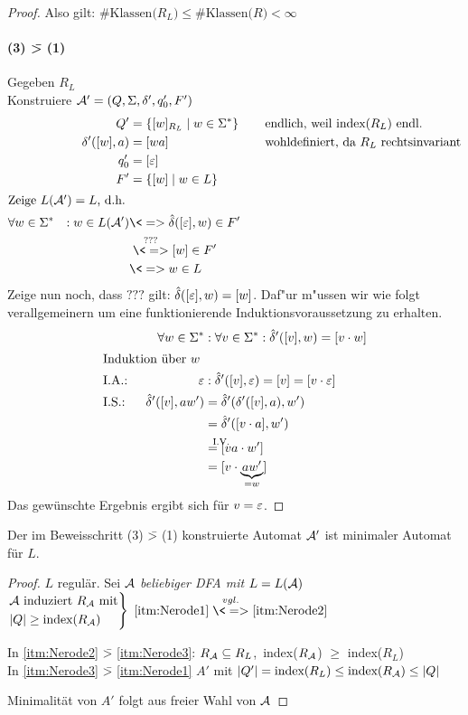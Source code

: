\begin{proof}
Also gilt: $\text{\#Klassen($R_L$)$\leq$\#Klassen($R$)}<\infty$

\paragraph{(3) \=> (1)} Gegeben $R_L$\\
		Konstruiere $\mathcal{A}'=(Q,\Sigma,\delta',q_0',F')$
		\begin{alignat*}{3}
			&&Q' &= \{ [w]_{R_L} \mid w\in \Sigma^* \} &\quad& \text{endlich, weil index($R_L$) endl.}\\
			&&\delta'([w],a) &= [wa] && \text{wohldefiniert, da $R_L$ rechtsinvariant}\\
			&&q_0' &= [\Eps]\\
			&&F' &= \{ [w] \mid w\in L \}\\
			\shortintertext{Zeige $L(\A')=L$, d.h. }
			&\forall w\in \Sigma^* &: w\in L(\A') &\<=> \hat\delta([\Eps],w)\in F'\\
			&&&\overset{???}{\<=>} [w]\in F' \\
			&&&\<=> w\in L
		\end{alignat*}
		Zeige nun noch, dass $???$ gilt: $\hat\delta([\varepsilon], w) = [w]$. 
		Daf"ur m"ussen wir wie folgt verallgemeinern um eine funktionierende Induktionsvoraussetzung zu erhalten.
		\begin{alignat*}{3}
			&&\forall w\in\Sigma^* &:
			\forall v\in\Sigma^* : \hat\delta'([v],w) = [v\cdot w]\\
			\shortintertext{Induktion über $w$}
			&\text{I.A.: }& \Eps &: \hat\delta'([v],\Eps) = [v]=[v\cdot\Eps]\\
			&\text{I.S.: }& \hat\delta'([v],aw') &= \hat\delta'(\delta'([v],a),w')\\
			&&&= \hat\delta'([v\cdot a],w')\\
			&&&\overset{\mathrlap{\text{I.V.}}}{=} [va\cdot w']\\
			&&&= [v\cdot \underbrace{aw'}_{=w}]
		\end{alignat*}
		Das gewünschte Ergebnis  ergibt sich für $v=\varepsilon$. \qedhere
\end{proof}
%
\setcounter{Korollar}{4}
\begin{Korollar}
	Der im Beweisschritt (3) \=> (1) konstruierte Automat $\mathcal{A}'$ ist minimaler Automat für $L$.
\end{Korollar}
\begin{proof}
	$L$ regulär. Sei $\mathcal{A}$ \emph{beliebiger \ac{DFA} mit $L=L(\mathcal{A})$}\\
	$\begin{rcases}
	\mathcal{A}\text{ induziert }R_{\mathcal{A}}\text{ mit}\\
	|Q|\geq\text{index}(R_{\mathcal{A}})
	\end{rcases}$ $\ref{itm:Nerode1} \overset{vgl.}{\<=>} \ref{itm:Nerode2}$
	
	In \ref{itm:Nerode2} \=> \ref{itm:Nerode3}: $R_{\mathcal{A}}\subseteq R_L$,\ index($R_{\mathcal{A}}$) $\geq$ index($R_L$)\\
	In \ref{itm:Nerode3} \=> \ref{itm:Nerode1} $A'$ mit $|Q'|=\text{index}(R_L) \leq \text{index}(R_{\mathcal{A}})\leq |Q|$
	
	Minimalität von $A'$ folgt aus freier Wahl von $\mathcal{A}$
\end{proof}

